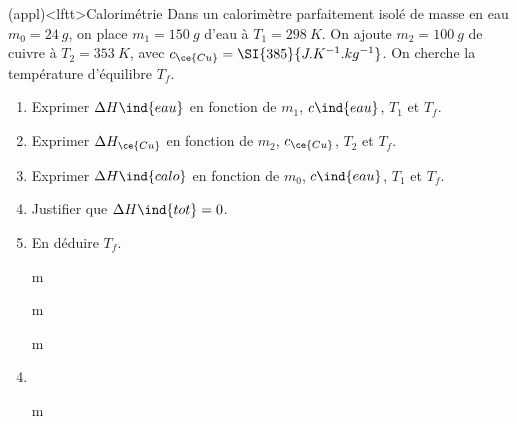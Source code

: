 \documentclass[../../main/main.tex]{subfiles}
\begin{document}
\begin{tcb*}(appl)<lftt>{Calorimétrie}
	Dans un calorimètre parfaitement isolé de masse en eau $m_0 = \SI{24}{g}$, on
	place $m_1 = \SI{150}{g}$ d'eau à $T_1 = \SI{298}{K}$. On ajoute $m_2 =
		\SI{100}{g}$ de cuivre à $T_2 = \SI{353}{K}$, avec $c_{\ce{Cu}} =
		\SI{385}{J.K^{-1}.kg^{-1}}$. On cherche la température d'équilibre $T_f$.
	\begin{enumerate}[label=\sqenumi]
		\item Exprimer $\Delta{H}\ind{eau}$ en fonction de $m_1$, $c\ind{eau}$,
		      $T_1$ et $T_f$.
		\item Exprimer $\Delta{H}_{\ce{Cu}}$ en fonction de $m_2$, $c_{\ce{Cu}}$,
		      $T_2$ et $T_f$.
		\item Exprimer $\Delta{H}\ind{calo}$ en fonction de $m_0$, $c\ind{eau}$,
		      $T_1$ et $T_f$.
		\item Justifier que $\Delta{H}\ind{tot} = 0$.
		\item En déduire $T_f$.
	\end{enumerate}
	\tcblower
	\begin{enumerate}[label=\sqenumi]
		\item[m]
			\vspace{-25pt}
		\item[m]
			\vspace{-25pt}
		\item[m]
			\vspace{-25pt}
		\item {}%
		\item[m]
	\end{enumerate}
	\vspace{-25pt}
\end{tcb*}
\end{document}
